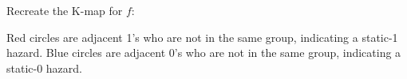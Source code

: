 \documentclass[12pt, a4paper]{article}
\begin{document}
	Recreate the K-map for $f$:
	\begin{center}
	\end{center}
	
	Red circles are adjacent 1's who are not in the same group, indicating a static-1 hazard.
	Blue circles are adjacent 0's who are not in the same group, indicating a static-0 hazard.
	
\end{document}
